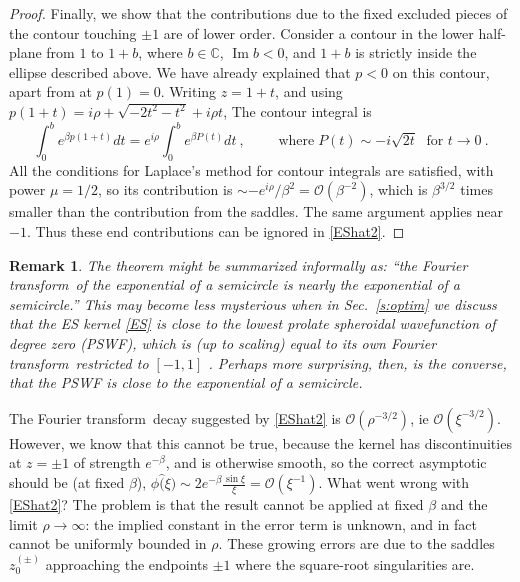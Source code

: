 \documentclass[10pt]{article}
\newcommand{\bigO}{{\mathcal O}}
\DeclareMathOperator{\im}{Im}
\newtheorem{rmk}[thm]{Remark}
\newcommand{\freq}{\beta}          %
\newcommand{\FT}{Fourier transform}
\begin{document}
\begin{proof}
Finally, we show that the contributions due to the fixed excluded
pieces of the contour touching $\pm1$ are of lower order.
Consider a contour in the lower half-plane
from $1$ to $1+b$, where $b\in\mathbb{C}$, $\im b<0$,
and $1+b$ is strictly inside the ellipse described above.
We have already explained that $p<0$ on this contour, apart from at $p(1)=0$.
Writing $z=1+t$, and using $p(1+t) = i\rho + \sqrt{-2t^2-t^2} + i\rho t$,
The contour integral is
$$ \int_0^b e^{\freq p(1+t)} dt = e^{i\rho}\int_0^b e^{\freq P(t)} dt
~,\qquad \mbox{ where} \; P(t) \sim -i\sqrt{2t} \; \mbox{ for } t\to 0~.
$$
All the conditions for
Laplace's method for contour integrals \cite[Thm.~6.1, p.~125]{olver}
are satisfied, with power $\mu=1/2$,
so its contribution is $\sim -e^{i\rho}/\freq^2 = \bigO(\freq^{-2})$,
which is $\freq^{3/2}$ times smaller than the contribution from the saddles.
The same argument applies near $-1$.
Thus these end contributions can be ignored in \eqref{EShat2}.
\end{proof}

\begin{rmk}
  The theorem might be summarized informally as:
  ``the \FT\ of the exponential
  of a semicircle is nearly the exponential of a semicircle.''
  This may become less mysterious when
    in Sec.~\ref{s:optim} we discuss that
    the ES kernel \eqref{ES} is close
    to the lowest prolate spheroidal wavefunction of degree zero (PSWF),
    which is (up to scaling)
    equal to its own \FT\ restricted to $[-1,1]$ \cite{osipov}.
    Perhaps more
    surprising, then, is the converse, that the PSWF is close to the exponential
    of a semicircle. %
%
\end{rmk}  

The \FT\ decay suggested by \eqref{EShat2} is $\bigO(\rho^{-3/2})$,
ie $\bigO(\xi^{-3/2})$. %
However, we know that this cannot be true,
because the kernel has discontinuities at $z=\pm 1$ of strength $e^{-\freq}$,
and is otherwise smooth, so
the correct asymptotic should be (at fixed $\freq$),
$\phi\hat(\xi) \sim 2 e^{-\freq} \frac{\sin \xi}{\xi} = \bigO(\xi^{-1})$.
What went wrong with \eqref{EShat2}?
The problem is that the result cannot be applied at fixed $\freq$
and the limit $\rho\to\infty$: the implied constant in the error
term is unknown, and in fact cannot be uniformly bounded in $\rho$.
These growing errors are due to the saddles $z_0^{(\pm)}$ approaching
the endpoints $\pm 1$ where the square-root singularities are.
\end{document}
